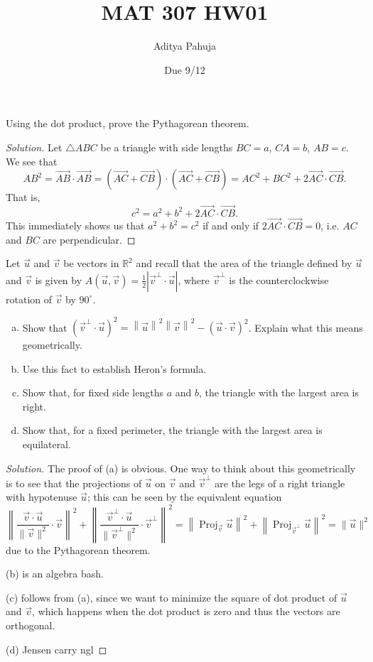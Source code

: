 \documentclass[11pt]{scrartcl}
\title{\vspace{-2em}MAT 307 HW01}
\author{\large Aditya Pahuja}
\date{\large Due 9/12}
\providecommand{\half}{\frac{1}{2}}
\providecommand{\RR}{\mathbb R}
\providecommand{\dg}{^\circ}
\providecommand{\ii}{\item}
\providecommand{\vect}[1]{\overrightarrow{#1}}
\providecommand{\norm}[1]{\left\|#1\right\|}
\newenvironment{soln}{\begin{proof}[Solution]}{\end{proof}}
\begin{document}
\maketitle

\begin{problem}
	Using the dot product, prove the Pythagorean theorem.
\end{problem}
\begin{soln}
	Let $\triangle ABC$ be a triangle with side lengths
	$BC = a$, $CA = b$, $AB = c$. We see that
	\[AB^2 = \overrightarrow{AB}\cdot\overrightarrow{AB}
	= (\overrightarrow{AC} + \overrightarrow{CB})\cdot
	(\vect{AC} + \vect{CB}) =
	AC^2 + BC^2 + 2\vect{AC}\cdot\vect{CB}. \]
	That is,
	\[c^2 = a^2 + b^2 + 2\vect{AC}\cdot\vect{CB}.\]
	This immediately shows us that $a^2 + b^2 = c^2$
	if and only if $2\vect{AC}\cdot\vect{CB} = 0$,
	i.e. $AC$ and $BC$ are perpendicular.
\end{soln}

\begin{problem}
	Let $\vec u$ and $\vec v$ be vectors in $\RR^2$
	and recall that the area of the triangle defined by $\vec u$ and $\vec v$
	is given by $A(\vec u, \vec v) = \half|\vec v^\perp \cdot \vec u|$,
	where $\vec v^\perp$ is the counterclockwise rotation of $\vec v$
	by $90\dg$.
	\begin{enumerate}[(a)]
		\ii Show that $(\vec v^\perp\cdot\vec u)^2 =
		\norm{\vec u}^2 \norm{\vec v}^2 - (\vec u\cdot\vec v)^2$.
		Explain what this means geometrically.
		\ii Use this fact to establish Heron's formula.
		\ii Show that, for fixed side lengths $a$ and $b$,
		the triangle with the largest area is right.
		\ii Show that, for a fixed perimeter, the triangle with
		the largest area is equilateral.
	\end{enumerate}
\end{problem}

\begin{soln}
	The proof of (a) is obvious. One way to think about this geometrically
	is to see that the projections of $\vec u$ on $\vec v$
	and $\vec v^\perp$ are the legs of a right triangle with hypotenuse
	$\vec u$; this can be seen by the equivalent equation
	\[\norm{\frac{\vec v\cdot\vec u}{\|\vec v\|^2}\cdot\vec v}^2
	+ \norm{\frac{\vec v^\perp\cdot\vec u}
	{\|\vec v^\perp\|^2}\cdot\vec v^\perp}^2
	= \norm{\operatorname{Proj}_{\vec v} \vec u}^2 +
	\norm{\operatorname{Proj}_{\vec v^\perp} \vec u}^2
	= \|\vec u\|^2\]
	due to the Pythagorean theorem.
	
	(b) is an algebra bash.
	
	(c) follows from (a), since we want to minimize the square of dot product
	of $\vec u$ and $\vec v$, which happens when the dot product is zero
	and thus the vectors are orthogonal.
	
	(d) Jensen carry ngl
\end{soln}
\end{document}
